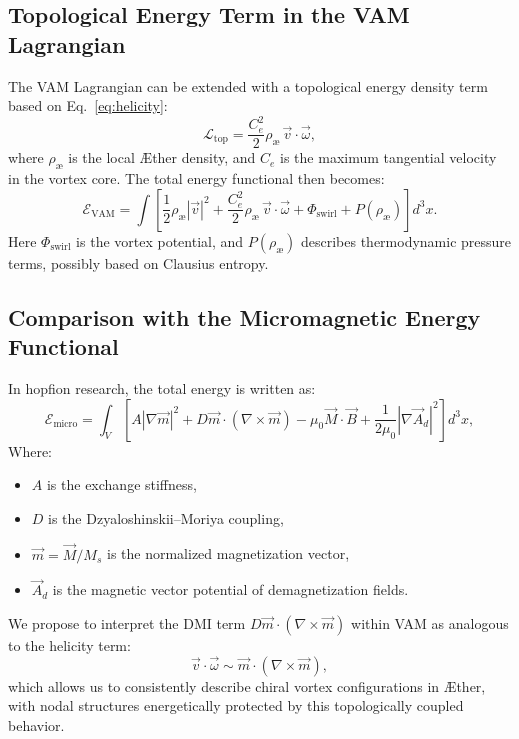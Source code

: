 \subsection{Topological Energy Term in the VAM Lagrangian}

The VAM Lagrangian can be extended with a topological energy density term based on Eq.~\eqref{eq:helicity}:
\begin{equation}
    \mathcal{L}_\text{top} = \frac{C_e^2}{2} \rho_\text{\ae} \, \vec{v} \cdot \vec{\omega},
\end{equation}
where $\rho_\text{\ae}$ is the local Æther density, and $C_e$ is the maximum tangential velocity in the vortex core. The total energy functional then becomes:
\begin{equation}
    \mathcal{E}_\text{VAM} = \int \left[
                                        \frac{1}{2} \rho_\text{\ae} |\vec{v}|^2
        + \frac{C_e^2}{2} \rho_\text{\ae} \, \vec{v} \cdot \vec{\omega}
                                        + \Phi_\text{swirl} + P(\rho_\text{\ae})
    \right] d^3x.
\end{equation}
Here $\Phi_\text{swirl}$ is the vortex potential, and $P(\rho_\text{\ae})$ describes thermodynamic pressure terms, possibly based on Clausius entropy.

\subsection{Comparison with the Micromagnetic Energy Functional}

In hopfion research, the total energy is written as:
\begin{equation}
    \mathcal{E}_\text{micro} = \int_V \left[
                                            A |\nabla \vec{m}|^2 + D \vec{m} \cdot (\nabla \times \vec{m}) - \mu_0 \vec{M} \cdot \vec{B} + \frac{1}{2\mu_0} |\nabla \vec{A}_d|^2
    \right] d^3x,
\end{equation}
Where:
\begin{itemize}
    \item $A$ is the exchange stiffness,
    \item $D$ is the Dzyaloshinskii–Moriya coupling,
    \item $\vec{m} = \vec{M}/M_s$ is the normalized magnetization vector,
    \item $\vec{A}_d$ is the magnetic vector potential of demagnetization fields.
\end{itemize}

We propose to interpret the DMI term $D \vec{m} \cdot (\nabla \times \vec{m})$ within VAM as analogous to the helicity term:
\begin{equation}
    \vec{v} \cdot \vec{\omega} \sim \vec{m} \cdot (\nabla \times \vec{m}),
\end{equation}
which allows us to consistently describe chiral vortex configurations in Æther, with nodal structures energetically protected by this topologically coupled behavior.

